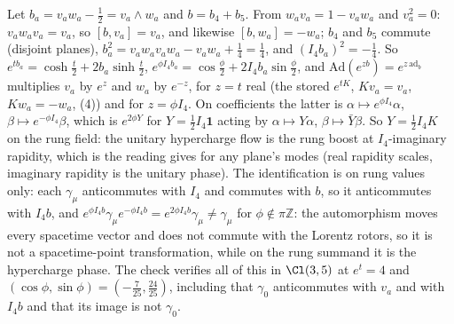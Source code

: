 Let $b_{a} = v_{a}w_{a} - \tfrac12 = v_{a}\wedge w_{a}$ and $b = b_{4} + b_{5}$. From $w_{a}v_{a} = 1 - v_{a}w_{a}$ and $v_{a}^{2} = 0$: $v_{a}w_{a}v_{a} = v_{a}$, so $[b, v_{a}] = v_{a}$, and likewise $[b, w_{a}] = -w_{a}$; $b_{4}$ and $b_{5}$ commute (disjoint planes), $b_{a}^{2} = v_{a}w_{a}v_{a}w_{a} - v_{a}w_{a} + \tfrac14 = \tfrac14$, and $(I_{4}b_{a})^{2} = -\tfrac14$. So $e^{tb_{a}} = \cosh\tfrac t2 + 2b_{a}\sinh\tfrac t2$, $e^{\phi I_{4}b_{a}} = \cos\tfrac\phi2 + 2I_{4}b_{a}\sin\tfrac\phi2$, and $\mathrm{Ad}(e^{zb}) = e^{z\,\mathrm{ad}_{b}}$ multiplies $v_{a}$ by $e^{z}$ and $w_{a}$ by $e^{-z}$, for $z = t$ real (the stored $e^{tK}$, $Kv_{a} = v_{a}$, $Kw_{a} = -w_{a}$, (4)) and for $z = \phi I_{4}$. On coefficients the latter is $\alpha \mapsto e^{\phi I_{4}}\alpha$, $\beta \mapsto e^{-\phi I_{4}}\beta$, which is $e^{2\phi Y}$ for $Y = \tfrac{1}{2}I_{4}\mathbf{1}$ acting by $\alpha \mapsto Y\alpha$, $\beta \mapsto \bar{Y}\beta$. So $Y = \tfrac12 I_{4}K$ on the rung field: the unitary hypercharge flow is the rung boost at $I_{4}$-imaginary rapidity, which is the reading  gives for any plane's modes (real rapidity scales, imaginary rapidity is the unitary phase). The identification is on rung values only: each $\gamma_{\mu}$ anticommutes with $I_{4}$ and commutes with $b$, so it anticommutes with $I_{4}b$, and $e^{\phi I_{4}b}\gamma_{\mu}e^{-\phi I_{4}b} = e^{2\phi I_{4}b}\gamma_{\mu} \ne \gamma_{\mu}$ for $\phi \notin \pi\mathbb{Z}$: the automorphism moves every spacetime vector and does not commute with the Lorentz rotors, so it is not a spacetime-point transformation, while on the rung summand it is the hypercharge phase. The check verifies all of this in $\Cl(3,5)$ at $e^{t} = 4$ and $(\cos\phi, \sin\phi) = (-\tfrac{7}{25}, \tfrac{24}{25})$, including that $\gamma_{0}$ anticommutes with $v_{a}$ and with $I_{4}b$ and that its image is not $\gamma_{0}$.

